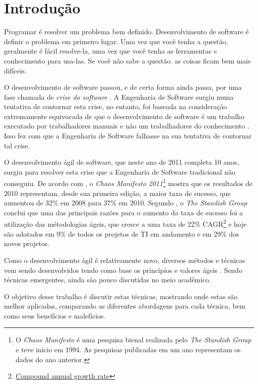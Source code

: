 \chapter{Introdução}

Programar é resolver um problema bem definido. Desenvolvimento de software é
definir o problema em primeiro lugar. Uma vez que você tenha a questão,
geralmente é fácil resolve-la, uma vez que você tenha as ferramentas e
conhecimento para usa-las. Se você não sabe a questão. as coisas ficam bem mais
difíceis. \cite{ProgrammingIsEasySoftwareDevelopmentIsHard}

O desenvolvimento de software passou, e de certa forma ainda passa, por uma fase
chamada de \emph{crise do software} \cite{HumbleProgrammer}. A Engenharia de
Software surgiu \cite{NaurRandell} numa tentativa de contornar esta crise, no
entanto, foi baseada na consideração extremamente equivocada de que o
desenvolvimento de software é um trabalho executado por trabalhadores manuais e
não um trabalhadores do conhecimento \cite[38]{XPTeles}. Isso fez com que a
Engenharia de Software falhasse na sua tentativa de contornar tal crise.

O desenvolvimento ágil de software, que neste ano de 2011 completa 10 anos,
surgiu \cite{AgileManifesto} para resolver esta crise que a Engenharia de
Software tradicional não conseguiu. De acordo com \cite{PMNetworkFailureDrop}, o
\textit{Chaos Manifesto 2011}\footnote{O \textit{Chaos Manifesto} é uma pesquisa
bienal realizada pelo \textit{The Standish Group} e teve início em 1994. As
pesquisas publicadas em um ano representam os dados do ano anterior.} mostra que
os resultados de 2010 representam, desde sua primeira edição, a maior taxa de
sucesso, que aumentou de 32\% em 2008 para 37\% em 2010. Segundo
\cite{ResumoChaosReport}, o \textit{The Standish Group} conclui que uma das
principais razões para o aumento da taxa de sucesso foi a utilização das
métodologias ágeis, que cresce a uma taxa de 22\%
CAGR\footnote{\href{http://en.wikipedia.org/wiki/Compound_annual_growth_rate}
{Compound annual growth rate}} e hoje são adotados em 9\% de todos os projetos
de TI em andamento e em 29\% dos novos projetos.

Como o desenvolvimento ágil é relativamente novo, diversos métodos e técnicas
vem sendo desenvolvidos tendo como base os princípios e valores ágeis
\cite{BDDRodrigo}. Sendo técnicas emergentes, ainda são pouco discutidas no meio
acadêmico.

O objetivo desse trabalho é discutir estas técnicas, mostrando onde estas são
melhor aplicadas, comparando as diferentes abordagens para cada técnica, bem
como seus benefícios e malefícios.
